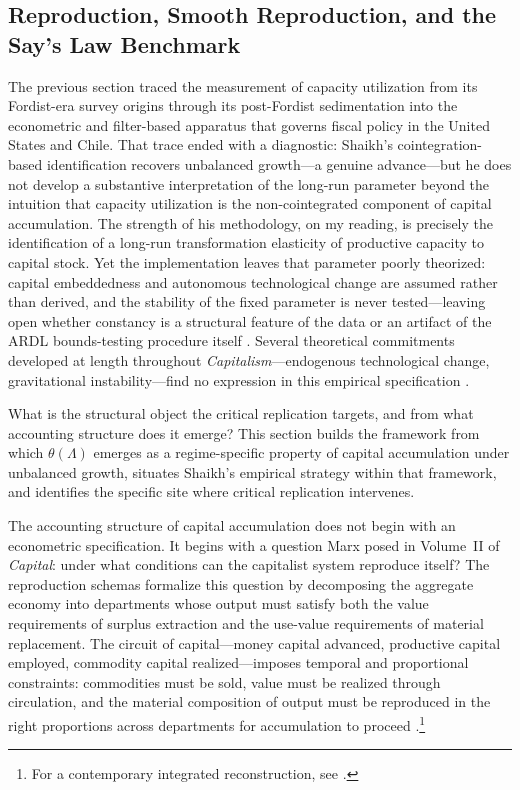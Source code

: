
\subsection{Reproduction, Smooth Reproduction, and the Say's Law Benchmark}
\label{sec:reproduction}

The previous section traced the measurement of capacity utilization from its Fordist-era survey origins through its post-Fordist sedimentation into the econometric and filter-based apparatus that governs fiscal policy in the United States and Chile. That trace ended with a diagnostic: Shaikh's cointegration-based identification recovers unbalanced growth---a genuine advance---but he does not develop a substantive interpretation of the long-run parameter beyond the intuition that capacity utilization is the non-cointegrated component of capital accumulation. The strength of his methodology, on my reading, is precisely the identification of a long-run transformation elasticity of productive capacity to capital stock. Yet the implementation leaves that parameter poorly theorized: capital embeddedness and autonomous technological change are assumed rather than derived, and the stability of the fixed parameter is never tested---leaving open whether constancy is a structural feature of the data or an artifact of the ARDL bounds-testing procedure itself \citep{Pesaran2001}. Several theoretical commitments developed at length throughout \emph{Capitalism}---endogenous technological change, gravitational instability---find no expression in this empirical specification \citep{Shaikh2016}.

What is the structural object the critical replication targets, and from what accounting structure does it emerge? This section builds the framework from which $\theta(\Lambda)$ emerges as a regime-specific property of capital accumulation under unbalanced growth, situates Shaikh's empirical strategy within that framework, and identifies the specific site where critical replication intervenes.

The accounting structure of capital accumulation does not begin with an econometric specification. It begins with a question Marx posed in Volume~II of \textit{Capital}: under what conditions can the capitalist system reproduce itself? The reproduction schemas formalize this question by decomposing the aggregate economy into departments whose output must satisfy both the value requirements of surplus extraction and the use-value requirements of material replacement. The circuit of capital---money capital advanced, productive capital employed, commodity capital realized---imposes temporal and proportional constraints: commodities must be sold, value must be realized through circulation, and the material composition of output must be reproduced in the right proportions across departments for accumulation to proceed \citep{MarxKVII}.\footnote{For a contemporary integrated reconstruction, see \citet[Ch.~4]{Basu2022}.}

